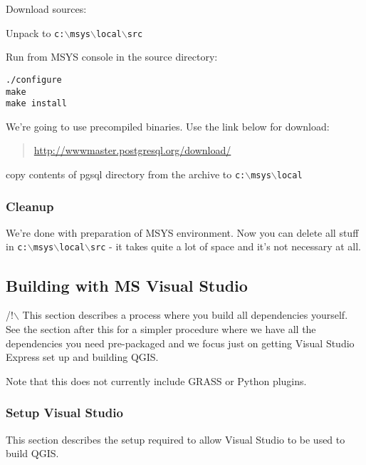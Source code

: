 Download sources:

	\begin{quotation}
	\end{quotation}

Unpack to \texttt{c:$\backslash$msys$\backslash$local$\backslash$src}

Run from MSYS console in the source directory:

\begin{verbatim}
./configure
make
make install
\end{verbatim}

We're going to use precompiled binaries. Use the link below for download:

	\begin{quotation}
\url{http://wwwmaster.postgresql.org/download/}
	\end{quotation}

copy contents of pgsql directory from the archive to \texttt{c:$\backslash$msys$\backslash$local}

\subsubsection{Cleanup}
We're done with preparation of MSYS environment. Now you can delete all stuff in \texttt{c:$\backslash$msys$\backslash$local$\backslash$src} - it takes quite a lot
of space and it's not necessary at all.


\subsection{Building with MS Visual Studio}
/!$\backslash$ This section describes a process where you build all dependencies yourself. See the section
after this for a simpler procedure where we have all the dependencies you need pre-packaged
and we focus just on getting Visual Studio Express set up and building QGIS.

Note that this does not currently include GRASS or Python plugins.

\subsubsection{Setup Visual Studio}
This section describes the setup required to allow Visual Studio to be used to build QGIS. 

